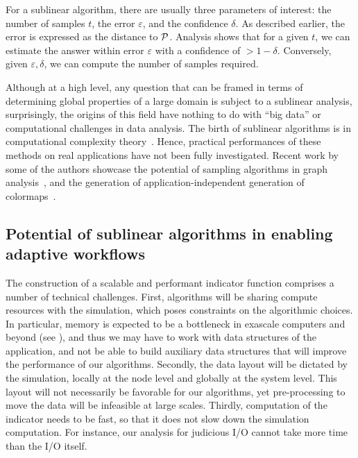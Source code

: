 \documentclass[final]{siamltex}
\newcommand{\cP}{{\cal P}}
\newcommand{\eps}{\varepsilon}
\begin{document}
For a sublinear algorithm, there are usually three parameters of interest: the number of samples $t$, the error $\eps$, and the
confidence $\delta$. As described earlier, the error is expressed as the distance to $\cP$.
Analysis shows that for a given $t$, we can estimate
the  answer within error $\eps$ with a confidence of $> 1 -\delta$. Conversely, given $\eps, \delta$,
we can compute the number of samples required.

Although at a high level, any question that can be framed in terms of determining global properties of a large domain is 
subject to a sublinear analysis, surprisingly, the origins of this field
have nothing to do with ``big data'' or computational challenges in data analysis. 
The birth of sublinear algorithms is in computational complexity theory~\cite{RS96}.
Hence, practical performances of  these methods on real applications have not been fully investigated. 
Recent work by some of the authors showcase the potential of sampling algorithms in graph
analysis~\cite{SePiKo13, SePiKo14, KoPiPlSe13, JhSePi13, JhSePi15,BaKo15}, and the generation of application-independent
generation of colormaps~\cite{TBSP13}.

\subsection{Potential of sublinear algorithms in enabling adaptive workflows}
The construction of a scalable and performant indicator function comprises a
number of technical challenges. First, algorithms will be sharing compute 
resources with the simulation, which poses constraints on the algorithmic choices. 
In particular, memory is expected to be a bottleneck in exascale computers 
and beyond (see ), and thus we may have to work with data 
structures of the application, and not be able to build auxiliary data 
structures that will improve the performance of our algorithms. Secondly, the 
data layout will be dictated by the simulation, locally at the node level 
and globally at the system level. This layout will not necessarily be favorable 
for our algorithms, yet pre-processing to move the data will be infeasible at 
large scales.  Thirdly,  computation of the indicator needs to be fast, so that it does not  
slow down  the simulation computation.  For instance,   our analysis for judicious I/O   
cannot take more time than the I/O itself.  
\end{document}
